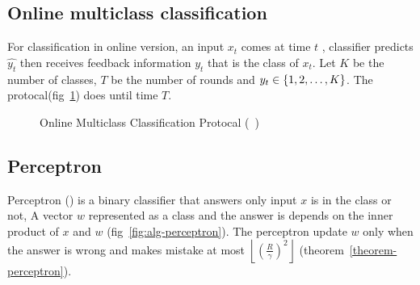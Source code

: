 \justify


\subsection{Online multiclass classification}
For classification in online version, an input $x_t$ comes at time $t$
, classifier predicts $\hat{y_t}$ then receives feedback information $y_t$ that is the class of $x_t$.
Let $K$ be the number of classes, $T$ be the number of rounds and $y_t\in \{1,2,\dots,K\}$.
The protocal(fig~\ref{fig:alg-online}) does until time $T$.

\begin{figure}[hbt!]
  \begin{algorithm}[H]
    \SetAlgoLined
    \DontPrintSemicolon
      \end{algorithm}
  \centering
  \caption{Online Multiclass Classification Protocal (~\cite{CrammerS2003-ultraconservative})}
  \label{fig:alg-online}
\end{figure}



\subsection{Perceptron}
Perceptron (\cite{rosenblatt58a}) is a binary classifier that answers only input $x$ is in the class or not,
A vector $w$ represented as a class and the answer is depends on the inner product of $x$ and $w$ (fig~\ref{fig:alg-perceptron}).
The perceptron update $w$ only when the answer is wrong 
and makes mistake at most $\left\lfloor \left( \frac{R}{\gamma} \right)^2\right\rfloor$ (theorem~\ref{theorem-perceptron}).

